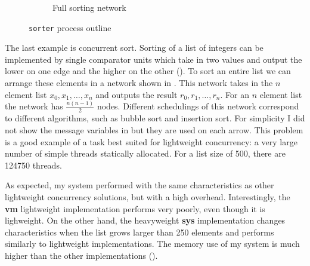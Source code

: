 \documentclass[12pt,twoside,notitlepage]{report}
\theoremstyle{plain}%
\theoremstyle{definition}
\theoremstyle{remark}
\begin{document}
\begin{figure}[H]
\begin{subfigure}[b]{0.45\linewidth}
\caption{Full sorting network}
\label{fig:sorter_process_full}
\end{subfigure}
\cprotect\caption{\verb|sorter| process outline}
\label{fig:sorter_process_outline}
\end{figure}


The last example is concurrent sort. Sorting of a list of integers can be implemented by single comparator units which take in two values and output the lower on one edge and the higher on the other (). To sort an entire list we can arrange these elements in a network shown in . This network takes in the $ n $ element list $ x_0, x_1, \dots, x_n $ and outputs the result $ r_0, r_1, \dots, r_n $. For an $ n $ element list the network has $ \frac{n(n-1)}{2} $ nodes. Different schedulings of this network correspond to different algorithms, such as bubble sort and insertion sort. For simplicity I did not show the message variables in  but they are used on each arrow. This problem is a good example of a task best suited for lightweight concurrency: a very large number of simple threads statically allocated. For a list size of 500, there are 124750 threads. 


As expected, my system performed with the same characteristics as other lightweight concurrency solutions, but with a high overhead. Interestingly, the \textbf{vm} lightweight implementation performs very poorly, even though it is lighweight. On the other hand, the heavyweight \textbf{sys} implementation changes characteristics when the list grows larger than 250 elements and performs similarly to lightweight implementations. The memory use of my system is much higher than the other implementations ().
\end{document}
